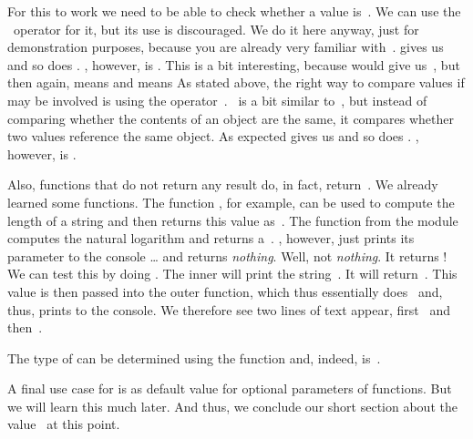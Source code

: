 For this to work we need to be able to check whether a value is~.
We can use the \pythonilIdx{==}~operator for it, but its use is discouraged.
We do it here anyway, just for demonstration purposes, because you are already very familiar with~\pythonil{==}.
 gives us  and so does .
, however, is .
This is a bit interesting, because  would give us~, but then again,  means  and  means %
%
%
%
As stated above, the right way to compare values if  may be involved is using the operator~.
~is a bit similar to~\pythonilIdx{==}, but instead of comparing whether the contents of an object are the same, it compares whether two values reference the same object.
As expected  gives us  and so does .
, however, is .

Also, functions that do not return any result do, in fact, return~.
We already learned some functions.
The function , for example, can be used to compute the length of a string and then returns this value as~.
The function  from the  module computes the natural logarithm and returns a~.
, however, just prints its parameter to the console {\dots} and returns \emph{nothing}.
Well, not \emph{nothing}.
It returns !
We can test this by doing .
The inner  will print the string~.
It will return~.
This value  is then passed into the outer  function, which thus essentially does~ and, thus, prints  to the console.
We therefore see two lines of text appear, first~ and then~.

The type of  can be determined using the  function and, indeed, is~.

A final use case for  is as default value for optional parameters of functions.
But we will learn this much later.
And thus, we conclude our short section about the value~ at this point.%
%
\FloatBarrier%
\endhsection%
%
